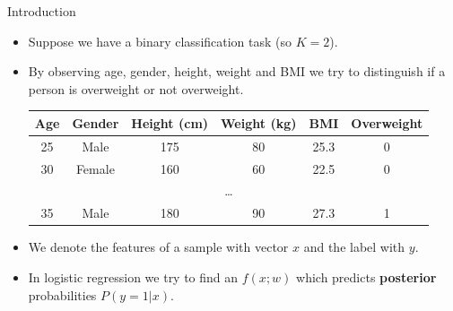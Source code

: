 \documentclass[serif, aspectratio=169]{beamer}
\begin{document}
\begin{frame}{Introduction}
    \begin{itemize}
        \item Suppose we have a binary classification task (so $K=2$).
        \item By observing \textcolor{deepred}{age}, \textcolor{deepred}{gender}, \textcolor{deepred}{height}, \textcolor{deepred}{weight} and \textcolor{deepred}{BMI} we try to distinguish if a person is \textcolor{deepgreen}{overweight} or \textcolor{deepgreen}{not overweight}.
        
        
        \begin{table}[h!]
        \centering
        \begin{tabular}{|c|c|c|c|c|c|}
        \hline
        \textcolor{deepred}{Age} & \textcolor{deepred}{Gender} & \textcolor{deepred}{Height (cm)} & \textcolor{deepred}{Weight (kg)} & \textcolor{deepred}{BMI} & \textcolor{deepgreen}{Overweight} \\ \hline
        25 & Male & 175 & 80 & 25.3 & 0 \\ \hline
        30 & Female & 160 & 60 & 22.5 & 0 \\ \hline
        \multicolumn{6}{|c|}{\dots} \\ \hline
        35 & Male & 180 & 90 & 27.3 & 1 \\ \hline
        \end{tabular}
        \end{table}
        \item We denote the \textcolor{deepred}{features} of a sample with vector $x$ and the \textcolor{deepgreen}{label} with $y$.
        \item In logistic regression we try to find an $f(x;w)$ which predicts \textbf{posterior} probabilities $P(y=1|x)$.
    \end{itemize}
    
\end{frame}
\end{document}

